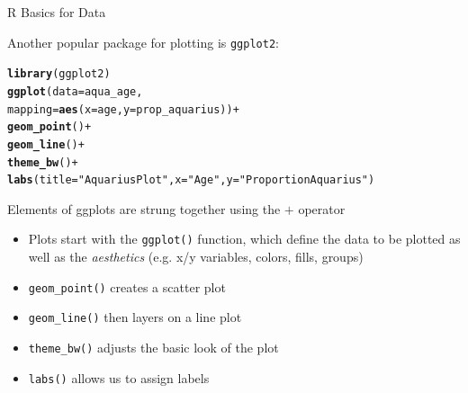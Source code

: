 \documentclass[svgnames,smaller]{beamer}\usepackage[]{graphicx}\usepackage[]{color}
\makeatletter
\newcommand{\hlstr}[1]{\textcolor[rgb]{0.192,0.494,0.8}{#1}}%
\newcommand{\hlopt}[1]{\textcolor[rgb]{0,0,0}{#1}}%
\newcommand{\hlstd}[1]{\textcolor[rgb]{0.345,0.345,0.345}{#1}}%
\newcommand{\hlkwc}[1]{\textcolor[rgb]{0.333,0.667,0.333}{#1}}%
\newcommand{\hlkwd}[1]{\textcolor[rgb]{0.737,0.353,0.396}{\textbf{#1}}}%
\newenvironment{kframe}{%
 \def\at@end@of@kframe{}%
 \ifinner\ifhmode%
  \def\at@end@of@kframe{\end{minipage}}%
  \begin{minipage}{\columnwidth}%
 \fi\fi%
 \def\FrameCommand##1{\hskip\@totalleftmargin \hskip-\fboxsep
 \colorbox{shadecolor}{##1}\hskip-\fboxsep
     \hskip-\linewidth \hskip-\@totalleftmargin \hskip\columnwidth}%
 \MakeFramed {\advance\hsize-\width
   \@totalleftmargin\z@ \linewidth\hsize
   \@setminipage}}%
 {\par\unskip\endMakeFramed%
 \at@end@of@kframe}
\newenvironment{knitrout}{}{} %
\makeatother
\begin{document}
\begin{frame}[fragile]{R Basics for Data}

Another popular package for plotting is \texttt{ggplot2}:
\begin{knitrout}\scriptsize
{}\color{fgcolor}\begin{kframe}
\begin{alltt}
\hlkwd{library}\hlstd{(ggplot2)}
\hlkwd{ggplot}\hlstd{(}\hlkwc{data} \hlstd{= aqua_age,}
       \hlkwc{mapping} \hlstd{=} \hlkwd{aes}\hlstd{(}\hlkwc{x} \hlstd{= age,} \hlkwc{y} \hlstd{= prop_aquarius))} \hlopt{+}
    \hlkwd{geom_point}\hlstd{()} \hlopt{+}
    \hlkwd{geom_line}\hlstd{()} \hlopt{+}
    \hlkwd{theme_bw}\hlstd{()} \hlopt{+}
    \hlkwd{labs}\hlstd{(}\hlkwc{title} \hlstd{=} \hlstr{"Aquarius Plot"}\hlstd{,} \hlkwc{x} \hlstd{=} \hlstr{"Age"}\hlstd{,} \hlkwc{y} \hlstd{=} \hlstr{"Proportion Aquarius"}\hlstd{)}
\end{alltt}
\end{kframe}
\end{knitrout}
Elements of ggplots are strung together using the $+$ operator
\begin{itemize}
    \item Plots start with the \texttt{ggplot()} function, which define the data to be plotted as well as the \textit{aesthetics} (e.g. x/y variables, colors, fills, groups)
    \item \texttt{geom\_point()} creates a scatter plot 
    \item \texttt{geom\_line()} then layers on a line plot
    \item \texttt{theme\_bw()} adjusts the basic look of the plot
    \item \texttt{labs()} allows us to assign labels
\end{itemize}

\end{frame}



\end{document}
